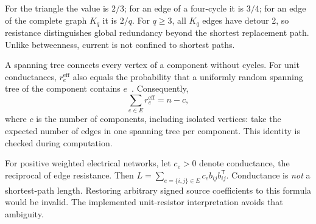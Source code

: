 \documentclass[11pt]{article}
\newcommand{\eff}{r^{\mathrm{eff}}}
\begin{document}
For the triangle the value is $2/3$; for an edge of a four-cycle it is $3/4$; for an edge of the complete graph $K_q$ it is $2/q$. For $q\geq3$, all $K_q$ edges have detour 2, so resistance distinguishes global redundancy beyond the shortest replacement path. Unlike betweenness, current is not confined to shortest paths.

A spanning tree connects every vertex of a component without cycles. For unit conductances, $\eff_e$ also equals the probability that a uniformly random spanning tree of the component contains $e$~\cite{spielman}. Consequently,
\begin{equation}
 \sum_{e\in E}\eff_e=n-c,
\end{equation}
where $c$ is the number of components, including isolated vertices: take the expected number of edges in one spanning tree per component. This identity is checked during computation.

For positive weighted electrical networks, let $c_e>0$ denote conductance, the reciprocal of edge resistance. Then $L=\sum_{e=\{i,j\}\in E}c_e b_{ij}b_{ij}^{\mathsf T}$. Conductance is \emph{not} a shortest-path length. Restoring arbitrary signed source coefficients to this formula would be invalid. The implemented unit-resistor interpretation avoids that ambiguity.

\clearpage
\end{document}
